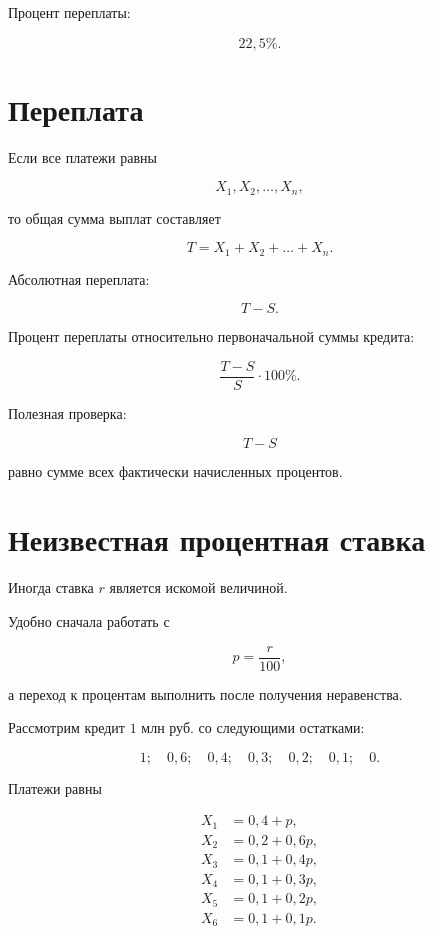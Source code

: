 \documentclass[a4paper,12pt]{article}
\begin{document}
Процент переплаты:

\[
\boxed{22{,}5\%}.
\]


\section{Переплата}

Если все платежи равны

\[
X_1,X_2,\ldots,X_n,
\]

то общая сумма выплат составляет

\[
T=X_1+X_2+\ldots+X_n.
\]

Абсолютная переплата:

\[
\boxed{T-S}.
\]

Процент переплаты относительно первоначальной суммы кредита:

\[
\boxed{
\frac{T-S}{S}\cdot100\%.
}
\]

Полезная проверка:

\[
T-S
\]

равно сумме всех фактически начисленных процентов.


\section{Неизвестная процентная ставка}

Иногда ставка \(r\) является искомой величиной.

Удобно сначала работать с

\[
p=\frac{r}{100},
\]

а переход к процентам выполнить после получения неравенства.

Рассмотрим кредит \(1\) млн руб. со следующими остатками:

\[
1;\quad 0{,}6;\quad0{,}4;\quad0{,}3;
\quad0{,}2;\quad0{,}1;\quad0.
\]

Платежи равны

\[
\begin{aligned}
X_1&=0{,}4+p,\\
X_2&=0{,}2+0{,}6p,\\
X_3&=0{,}1+0{,}4p,\\
X_4&=0{,}1+0{,}3p,\\
X_5&=0{,}1+0{,}2p,\\
X_6&=0{,}1+0{,}1p.
\end{aligned}
\]
\end{document}
